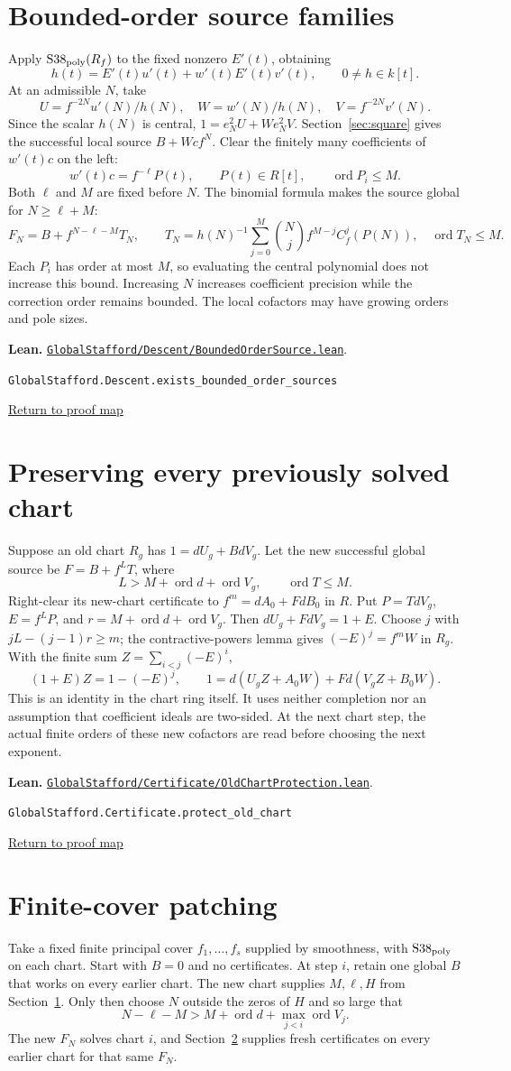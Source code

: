 \documentclass[11pt,a4paper]{article}
\newcommand{\code}[1]{\nolinkurl{#1}}
\newcommand{\ord}{\operatorname{ord}}
\newcommand{\backmap}{\hfill\hyperref[fig:map]{\small Return to proof map}}
\newcommand{\leanref}[2]{\par\smallskip\noindent\textbf{Lean.} \href{https://github.com/itpplasma/global-stafford-formal/blob/b21883a5b3d8f46922713049c3b060523ea3a771/#1}{\nolinkurl{#1}}.\par\noindent\small\code{#2}\par\normalsize\backmap}
\begin{document}
\section{Bounded-order source families}\label{sec:bounded}
Apply $\mathrm{S38}_{\rm poly}(R_f)$ to the fixed nonzero $E'(t)$, obtaining
\[
 h(t)=E'(t)u'(t)+w'(t)E'(t)v'(t),\qquad 0\ne h\in k[t].
\]
At an admissible $N$, take
\[
 U=f^{-2N}u'(N)/h(N),\quad W=w'(N)/h(N),\quad V=f^{-2N}v'(N).
\]
Since the scalar $h(N)$ is central, $1=e_N^2U+We_N^2V$.
Section~\ref{sec:square} gives the successful local source $B+Wcf^N$.
Clear the finitely many coefficients of $w'(t)c$ on the left:
\[
 w'(t)c=f^{-\ell}P(t),\qquad P(t)\in R[t],\qquad \ord P_i\le M.
\]
Both $\ell$ and $M$ are fixed before $N$. The binomial formula makes the source
global for $N\ge\ell+M$:
\[
 F_N=B+f^{N-\ell-M}T_N,\qquad
 T_N=h(N)^{-1}\sum_{j=0}^{M}\binom Nj f^{M-j}C_f^j(P(N)),
 \quad \ord T_N\le M.
\]
Each $P_i$ has order at most $M$, so evaluating the central polynomial does
not increase this bound. Increasing $N$ increases coefficient precision while
the correction order remains bounded. The local cofactors may have growing
orders and pole sizes.
\leanref{GlobalStafford/Descent/BoundedOrderSource.lean}{GlobalStafford.Descent.exists_bounded_order_sources}

\section{Preserving every previously solved chart}\label{sec:protect}
Suppose an old chart $R_g$ has $1=dU_g+BdV_g$. Let the new successful global
source be $F=B+f^LT$, where
\[
 L>M+\ord d+\ord V_g,\qquad \ord T\le M.
\]
Right-clear its new-chart certificate to $f^m=dA_0+FdB_0$ in $R$.
Put $P=TdV_g$, $E=f^LP$, and $r=M+\ord d+\ord V_g$. Then
$dU_g+FdV_g=1+E$. Choose $j$ with $jL-(j-1)r\ge m$; the contractive-powers
lemma gives $(-E)^j=f^mW$ in $R_g$. With the finite sum
$Z=\sum_{i<j}(-E)^i$,
\[
 (1+E)Z=1-(-E)^j,\qquad
 1=d(U_gZ+A_0W)+Fd(V_gZ+B_0W).
\]
This is an identity in the chart ring itself. It uses neither completion nor
an assumption that coefficient ideals are two-sided. At the next chart step,
the actual finite orders of these new cofactors are read before choosing the
next exponent.
\leanref{GlobalStafford/Certificate/OldChartProtection.lean}{GlobalStafford.Certificate.protect_old_chart}

\section{Finite-cover patching}\label{sec:patch}
Take a fixed finite principal cover $f_1,\ldots,f_s$ supplied by smoothness,
with $\mathrm{S38}_{\rm poly}$ on each chart. Start with $B=0$ and no
certificates. At step $i$, retain one global $B$ that works on every earlier
chart. The new chart supplies $M,\ell,H$ from Section~\ref{sec:bounded}.
Only then choose $N$ outside the zeros of $H$ and so large that
\[
 N-\ell-M>M+\ord d+\max_{j<i}\ord V_j.
\]
The new $F_N$ solves chart $i$, and Section~\ref{sec:protect} supplies fresh
certificates on every earlier chart for that same $F_N$.
\end{document}
